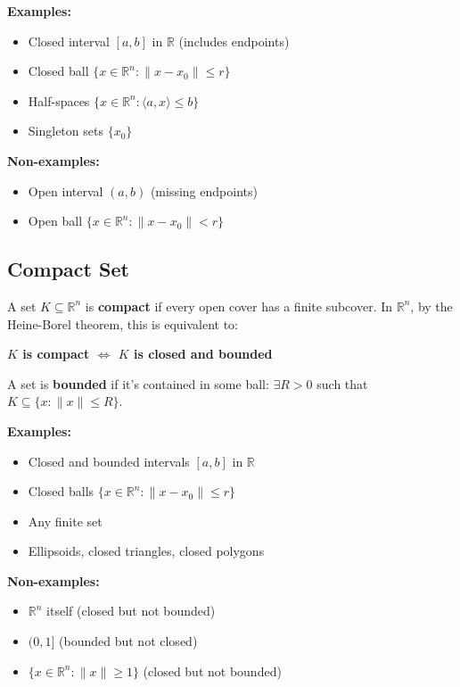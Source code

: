 \documentclass{tufte-handout}
\begin{document}
\textbf{Examples:}
\begin{itemize}
    \item Closed interval $[a, b]$ in $\mathbb{R}$ (includes endpoints)
    \item Closed ball $\{x \in \mathbb{R}^n : \|x - x_0\| \leq r\}$
    \item Half-spaces $\{x \in \mathbb{R}^n : \langle a, x \rangle \leq b\}$
    \item Singleton sets $\{x_0\}$
\end{itemize}

\textbf{Non-examples:}
\begin{itemize}
    \item Open interval $(a, b)$ (missing endpoints)
    \item Open ball $\{x \in \mathbb{R}^n : \|x - x_0\| < r\}$
\end{itemize}


\subsection{Compact Set}
A set $K \subseteq \mathbb{R}^n$ is \textbf{compact} if every open cover has a finite subcover. In $\mathbb{R}^n$, by the Heine-Borel theorem, this is equivalent to:

\textbf{$K$ is compact $\iff$ $K$ is closed and bounded}

A set is \textbf{bounded} if it's contained in some ball: $\exists R > 0$ such that $K \subseteq \{x : \|x\| \leq R\}$.

\textbf{Examples:}
\begin{itemize}
    \item Closed and bounded intervals $[a, b]$ in $\mathbb{R}$
    \item Closed balls $\{x \in \mathbb{R}^n : \|x - x_0\| \leq r\}$
    \item Any finite set
    \item Ellipsoids, closed triangles, closed polygons
\end{itemize}

\textbf{Non-examples:}
\begin{itemize}
    \item $\mathbb{R}^n$ itself (closed but not bounded)
    \item $(0, 1]$ (bounded but not closed)
    \item $\{x \in \mathbb{R}^n : \|x\| \geq 1\}$ (closed but not bounded)
\end{itemize}
\end{document}

